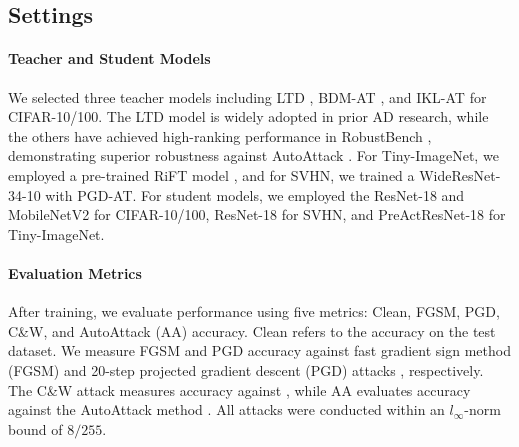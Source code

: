 \documentclass{article} %
\begin{document}
\begin{table}[t]
\begin{tabular}{lcccccccccc}
\bottomrule
 \end{tabular}
 \label{tab:main_resnet_cifar10_svhn}
\end{table}


\subsection{Settings}
\paragraph{Teacher and Student Models}
We selected three teacher models including  LTD \citep{LTD}, BDM-AT \citep{wang2023better}, and IKL-AT \citep{cui2023decoupled} for CIFAR-10/100.
The LTD model is widely adopted in prior AD research, while the others have achieved high-ranking performance in RobustBench \citep{croce2021robustbench}, demonstrating superior robustness against AutoAttack \citep{AutoAttack}.
For Tiny-ImageNet, we employed a pre-trained RiFT model \citep{zhu2023improving}, and for SVHN, we trained a WideResNet-34-10 \citep{BMVC2016_87} with PGD-AT.
For student models, we employed the ResNet-18 \citep{he2016deep} and MobileNetV2 \citep{sandler2018mobilenetv2} for CIFAR-10/100, ResNet-18 for SVHN, and PreActResNet-18 \citep{he2016identity} for Tiny-ImageNet.

\paragraph{Evaluation Metrics}
After training, we evaluate performance using five metrics: Clean, FGSM, PGD, C\&W, and AutoAttack (AA) accuracy. Clean refers to the accuracy on the test dataset. We measure FGSM and PGD accuracy against fast gradient sign method (FGSM) \citep{FGSM} and 20-step projected gradient descent (PGD) attacks \citep{PGD}, respectively. The C\&W attack measures accuracy against \cite{CW_attack}, while AA evaluates accuracy against the AutoAttack method \citep{AutoAttack}. All attacks were conducted within an $l_{\infty}$-norm bound of $8/255$.
\end{document}
